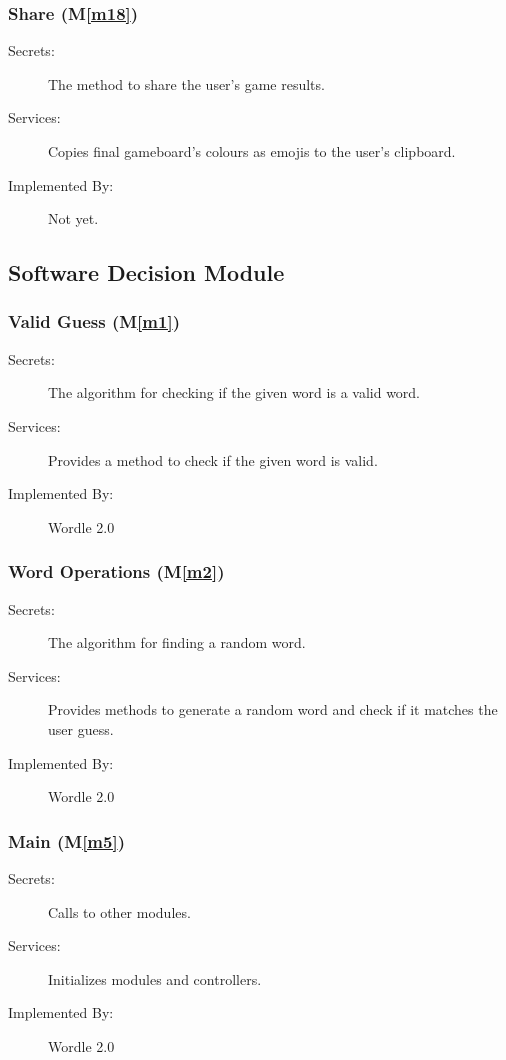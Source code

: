 \documentclass[12pt, titlepage]{article}
\newcommand{\mref}[1]{M\ref{#1}}
\begin{document}
	\subsubsection{Share (\mref{m18})}
	\begin{description}
		\item[Secrets:]The method to share the user's game results.
		\item[Services:] Copies final gameboard's colours as emojis to the user's clipboard.
		\item[Implemented By:] Not yet.
	\end{description}
	
	\subsection{Software Decision Module}
	
	\subsubsection{Valid Guess (\mref{m1})}
	\begin{description}
		\item[Secrets:]The algorithm for checking if the given word is a valid word.
		\item[Services:]Provides a method to check if the given word is valid.
		\item[Implemented By:] Wordle 2.0
	\end{description}
	
	\subsubsection{Word Operations (\mref{m2})}
	\begin{description}
		\item[Secrets:]The algorithm for finding a random word.
		\item[Services:]Provides methods to generate a random word and check if it matches the user guess.
		\item[Implemented By:] Wordle 2.0
	\end{description}
	
	\subsubsection{Main (\mref{m5})}
	\begin{description}
		\item[Secrets:]Calls to other modules.
		\item[Services:]Initializes modules and controllers.
		\item[Implemented By:] Wordle 2.0
	\end{description}
	
\end{document}
